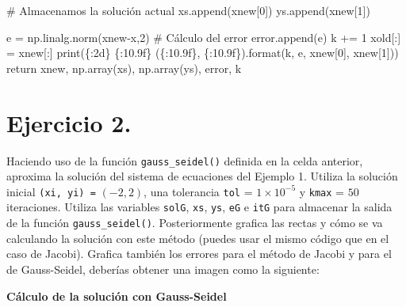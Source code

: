 \documentclass[
  letterpaper,
  DIV=11,
  numbers=noendperiod]{scrreprt}
\newenvironment{Shaded}{\begin{snugshade}}{\end{snugshade}}
\newcommand{\BuiltInTok}[1]{\textcolor[rgb]{0.00,0.23,0.31}{#1}}
\newcommand{\CommentTok}[1]{\textcolor[rgb]{0.37,0.37,0.37}{#1}}
\newcommand{\ControlFlowTok}[1]{\textcolor[rgb]{0.00,0.23,0.31}{#1}}
\newcommand{\DecValTok}[1]{\textcolor[rgb]{0.68,0.00,0.00}{#1}}
\newcommand{\NormalTok}[1]{\textcolor[rgb]{0.00,0.23,0.31}{#1}}
\newcommand{\OperatorTok}[1]{\textcolor[rgb]{0.37,0.37,0.37}{#1}}
\newcommand{\SpecialCharTok}[1]{\textcolor[rgb]{0.37,0.37,0.37}{#1}}
\newcommand{\StringTok}[1]{\textcolor[rgb]{0.13,0.47,0.30}{#1}}
\begin{document}
\begin{Shaded}
\begin{Highlighting}[]
        \CommentTok{\# Almacenamos la solución actual}
\NormalTok{        xs.append(xnew[}\DecValTok{0}\NormalTok{])}
\NormalTok{        ys.append(xnew[}\DecValTok{1}\NormalTok{])}

\NormalTok{        e }\OperatorTok{=}\NormalTok{ np.linalg.norm(xnew}\OperatorTok{{-}}\NormalTok{x,}\DecValTok{2}\NormalTok{) }\CommentTok{\# Cálculo del error}
\NormalTok{        error.append(e)}
\NormalTok{        k }\OperatorTok{+=} \DecValTok{1}
\NormalTok{        xold[:] }\OperatorTok{=}\NormalTok{ xnew[:]}
        \BuiltInTok{print}\NormalTok{(}\StringTok{\textquotesingle{}}\SpecialCharTok{\{:2d\}}\StringTok{ }\SpecialCharTok{\{:10.9f\}}\StringTok{ (}\SpecialCharTok{\{:10.9f\}}\StringTok{, }\SpecialCharTok{\{:10.9f\}}\StringTok{)\textquotesingle{}}\NormalTok{.}\BuiltInTok{format}\NormalTok{(k, e, xnew[}\DecValTok{0}\NormalTok{], xnew[}\DecValTok{1}\NormalTok{]))}
    \ControlFlowTok{return}\NormalTok{ xnew, np.array(xs), np.array(ys), error, k}
\end{Highlighting}
\end{Shaded}

\section{\texorpdfstring{\textbf{Ejercicio
2.}}{Ejercicio 2.}}\label{ejercicio-2.-4}

Haciendo uso de la función \texttt{gauss\_seidel()} definida en la celda
anterior, aproxima la solución del sistema de ecuaciones del Ejemplo 1.
Utiliza la solución inicial \texttt{(xi,\ yi)\ =} \((-2, 2)\), una
tolerancia \texttt{tol} = \(1 \times 10^{-5}\) y \texttt{kmax} = \(50\)
iteraciones. Utiliza las variables \texttt{solG}, \texttt{xs},
\texttt{ys}, \texttt{eG} e \texttt{itG} para almacenar la salida de la
función \texttt{gauss\_seidel()}. Posteriormente grafica las rectas y
cómo se va calculando la solución con este método (puedes usar el mismo
código que en el caso de Jacobi). Grafica también los errores para el
método de Jacobi y para el de Gauss-Seidel, deberías obtener una imagen
como la siguiente:

\textbf{Cálculo de la solución con Gauss-Seidel}
\end{document}

